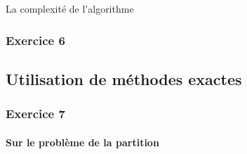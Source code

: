 \documentclass[a4paper, 12pt]{article}
\begin{document}
La complexité de l'algorithme 

\subsubsection*{Exercice 6}

\subsection{Utilisation de méthodes exactes}

\subsubsection*{Exercice 7}

\paragraph{Sur le problème de la partition}
\end{document}
